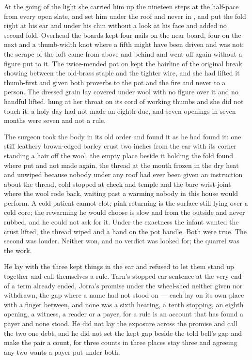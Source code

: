 At the going of the light she carried him up the nineteen steps at the half-pace from every open slate, and set him under the roof and never in , and put the fold right at his ear and under his chin without a look at his face and added no second fold. Overhead the boards kept four nails on the near board, four on the next and a thumb-width knot where a fifth might have been driven and was not; the scrape of the loft came from above and behind and went off again without a figure put to it. The twice-mended pot on  kept the hairline of the original break showing between the old-brass staple and the tighter wire, and she had lifted it thumb-first and given both proverbs to the pot and the fire and never to a person. The dressed grain lay covered under wool with no figure over it and no handful lifted.  hung at her throat on its cord of working thumbs and she did not touch it: a holy day had not made an eighth due, and seven openings in seven months were seven and not a rule.

The surgeon took the body in its old order and found it as he had found it: one stiff leathery brown-edged barley crust two inches from the ear with its corner standing a hair off the wool, the empty place beside it holding the fold found where put and not made again, the thread at the mouth frozen in the dry heat and unwiped because nobody under any roof had ever been given an instruction about the thread, cold stopped at cheek and temple and the bare wrist-joint where the wool rode back,  waiting past a warming nobody in this house would perform. A cold patient cannot clot; pink returning is the surface still lying over a cold core; the rewarming he would choose is slow and from the outside and never rubbed, and he could not ask for it. Under the exactness the infant wanted the crust lifted, the thread wiped and a hand on the pot handle. Both were true. The second was louder. Neither won, and no verdict was looked for; the quarrel was the work.

He lay with the three kept things in the ear and refused to let them stand up together and call themselves a rule. Tarn's stopped ear-sentence at the very end of a term already ended, Jorra's promise under the wheel-shed neither given nor withdrawn, the gap where a name had not stood on  --- each lay on its own place with a finger between, and none was a sixth hearing, a tenth stopping, an eighth opening, a witness, a reader or a payer, for a rule is an account that has found a payer and none stood. He did not lay the exposure across the promise and call the two one debt, and he did not set the kept gap beside the told bell's gap and make the pair a count, for three counts in three places stay three and agreeing any two wants a payer put under both.

